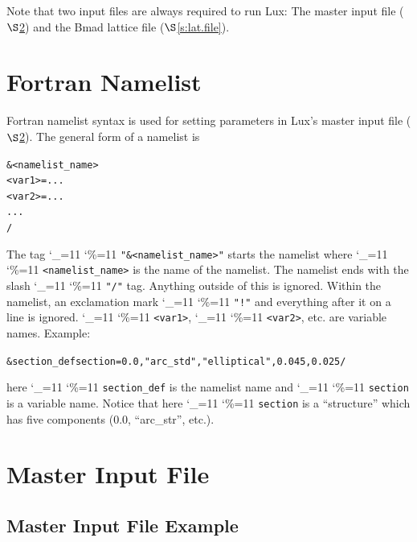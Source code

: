 \documentclass[11pt]{article}
\newcommand{\lux}{Lux\xspace}
\newcommand\ttcmd{\begingroup\catcode`\_=11 \catcode`\%=11 \dottcmd}
\newcommand\dottcmd[1]{\texttt{#1}\endgroup}
\newcommand{\vn}{\ttcmd}
\newcommand{\sref}[1]{$\S$\ref{#1}}
\newenvironment{example}
  {\vspace{\ExBeg} \begin{alltt}}
  {\end{alltt} \vspace{\ExEnd}}
\newlength{\ExBeg}
\newlength{\ExEnd}
\begin{document}
Note that two input files are always required to run \lux: The master input file
(\sref{s:master.file}) and the Bmad lattice file (\sref{s:lat.file}).

\section{Fortran Namelist}
\label{s:namelist}

Fortran namelist syntax is used for setting parameters in \lux's
master input file (\sref{s:master.file}). The general form of a
namelist is
\begin{example}
  &<namelist_name>
    <var1> = ...
    <var2> = ...
    ...
  /
\end{example}
The tag \vn{"\&<namelist_name>"} starts the namelist where
\vn{<namelist_name>} is the name of the namelist. The namelist ends
with the slash \vn{"/"} tag. Anything outside of this is
ignored. Within the namelist, an exclamation mark \vn{"!"} and
everything after it on a line is ignored. \vn{<var1>}, \vn{<var2>},
etc. are variable names. Example:
\begin{example}
  &section_def section =   0.0, "arc_std", "elliptical", 0.045, 0.025 /
\end{example}
here \vn{section_def} is the namelist name and \vn{section} is a variable
name.  Notice that here \vn{section} is a ``structure'' which has five
components (0.0, ``arc_str'', etc.).



\section{Master Input File} 
\label{s:master.file}

\subsection{Master Input File Example}
\label{ss:master.example}
\end{document}
